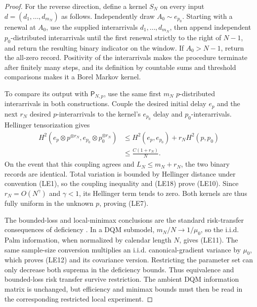 \begin{proof}
For the reverse direction, define a kernel \(S_N\) on every input
\(d=(d_1,\ldots,d_{m_N})\) as follows.  Independently draw
\(A_0\sim e_{p_0}\).  Starting with a renewal at \(A_0\), use the supplied
interarrivals \(d_1,\ldots,d_{m_N}\), then append independent
\(p_0\)-distributed interarrivals until the first renewal strictly to the
right of \(N-1\), and return the resulting binary indicator on the window.
If \(A_0>N-1\), return the all-zero record.  Positivity of the interarrivals
makes the procedure terminate after finitely many steps, and its definition
by countable sums and threshold comparisons makes it a Borel Markov kernel.

To compare its output with \(\mathsf P_{N,p}\), use the same first \(m_N\)
\(p\)-distributed interarrivals in both constructions.  Couple the desired
initial delay \(e_p\) and the next \(r_N\) desired \(p\)-interarrivals to
the kernel's \(e_{p_0}\) delay and \(p_0\)-interarrivals.  Hellinger
tensorization gives
\[
\begin{aligned}
 H^2(e_p\otimes p^{\otimes r_N},
     e_{p_0}\otimes p_0^{\otimes r_N})
 &\le H^2(e_p,e_{p_0})+r_NH^2(p,p_0)\\
 &\le \frac{C(1+r_N)}N.
\end{aligned}
\tag{LE18}
\]
On the event that this coupling agrees and \(L_N\le m_N+r_N\), the two
binary records are identical.  Total variation is bounded by Hellinger
distance under convention \textup{(LE1)}, so the coupling inequality and
\textup{(LE18)} prove \textup{(LE10)}.  Since
\(r_N=O(N^\gamma)\) and \(\gamma<1\), its Hellinger term tends to zero.
Both kernels are thus fully uniform in the unknown \(p\), proving
\textup{(LE7)}.

The bounded-loss and local-minimax conclusions are the standard risk-transfer
consequences of deficiency \cite{LeCamYang2000}.  In a DQM submodel,
\(m_N/N\to1/\mu_0\), so the i.i.d. Palm information, when normalized by
calendar length \(N\), gives \textup{(LE11)}.  The same sample-size
conversion multiplies an i.i.d. canonical-gradient variance by \(\mu_0\),
which proves \textup{(LE12)} and its covariance version.  Restricting the
parameter set can only decrease both suprema in the deficiency bounds.
Thus equivalence and bounded-loss risk transfer survive restriction.  The
ambient DQM information matrix is unchanged, but efficiency and minimax bounds
must then be read in the corresponding restricted local experiment.
\end{proof}

